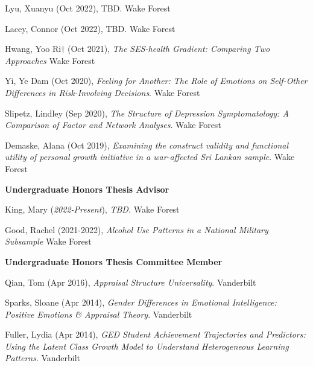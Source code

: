 \begin{etaremune}%
\item  Lyu, Xuanyu (Oct 2022), TBD.  Wake Forest%
\item Lacey, Connor (Oct 2022), TBD.  Wake Forest%
\item Hwang, Yoo Ri$\dagger$ (Oct 2021), \textit{The SES-health Gradient: Comparing Two Approaches} Wake Forest%
\item Yi, Ye Dam (Oct 2020), \textit{Feeling for Another: The Role of Emotions on Self-Other Differences in Risk-Involving Decisions}. Wake Forest%
\item Slipetz, Lindley (Sep 2020), \textit{The Structure of Depression Symptomatology: A Comparison of Factor and Network Analyses}. Wake Forest%
\item Demaske, Alana (Oct 2019), \textit{Examining the construct validity and functional utility of personal growth initiative in a war-affected Sri Lankan sample}. Wake Forest%
\end{etaremune}%
%
{\large\textbf{Undergraduate Honors Thesis Advisor}}
\begin{etaremune}%
\item King, Mary (\textit{2022-Present}), \textit{TBD.} Wake Forest%
\item Good, Rachel (2021-2022), \textit{Alcohol Use Patterns in a National Military Subsample} Wake Forest%
\end{etaremune}%

{\large\textbf{Undergraduate Honors Thesis Committee Member}}
\begin{etaremune}
\item Qian, Tom (Apr 2016), \textit{Appraisal Structure Universality}. Vanderbilt%
%
\item Sparks, Sloane (Apr 2014), \textit{Gender Differences in Emotional Intelligence: Positive Emotions \& Appraisal Theory}. Vanderbilt%
\item Fuller, Lydia (Apr 2014), \textit{GED Student Achievement Trajectories and Predictors: Using the Latent Class Growth Model to Understand Heterogeneous Learning Patterns}. Vanderbilt%
\end{etaremune}
